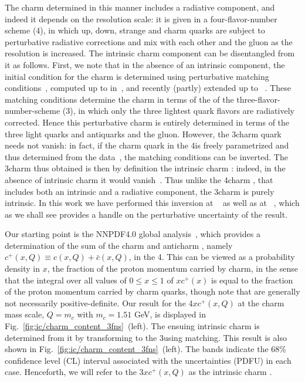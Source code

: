 The charm \pdf determined in this manner includes a  radiative component, and
indeed it depends on the resolution scale: it is  given in a four-flavor-number
scheme (4\fns), in which up,  down, strange and charm quarks are subject to 
perturbative radiative corrections and mix with each other and the gluon as the
resolution is increased.
%
The intrinsic charm component can be disentangled from it as follows.
%
First, we note that in the absence of an intrinsic component, the initial
condition for the charm \pdf is determined using perturbative matching
conditions~\cite{Collins:1986mp}, computed  up to \nnlo in~\cite{pdfnnlo},
and recently (partly) extended up to \nnnlo~\cite{Bierenbaum:2009zt,Bierenbaum:2009mv,Ablinger:2010ty,Ablinger:2014vwa,Ablinger:2014uka,Behring:2014eya,Ablinger_2014,Ablinger:2014nga,Blumlein:2017wxd}.
%
These matching conditions  determine the charm \pdf in terms of the \pdfs of the
three-flavor-number-scheme (3\fns), in which only the three lightest quark 
flavors are radiatively corrected.
%
Hence this perturbative charm \pdf is entirely determined in terms of the three
light quarks and antiquarks and the gluon.
%
However, the 3\fns charm quark \pdf needs not
vanish: in fact, if the charm quark \pdf in the 4\fns is freely
parametrized and thus determined from the data~\cite{Ball:2015tna},
the matching conditions can be inverted.
%
The 3\fns charm \pdf
thus obtained is then by definition the intrinsic charm \pdf: indeed, in
the absence of intrinsic charm it would vanish~\cite{Ball:2015dpa}. 
Thus unlike the 4\fns charm \pdf, that
includes both an intrinsic and a radiative
component, the 3\fns charm
\pdf is purely intrinsic.
%
In this work we have performed this inversion at
\nnlo~\cite{pdfnnlo} as well as at \nnnlo~\cite{Bierenbaum:2009zt,Bierenbaum:2009mv,Ablinger:2010ty,Ablinger:2014vwa,Ablinger:2014uka,Behring:2014eya,Ablinger_2014,Ablinger:2014nga,Blumlein:2017wxd},
which as we shall see provides a handle on the perturbative uncertainty of the \nnlo result.

Our starting point is the NNPDF4.0 global
analysis~\cite{Ball:2021leu}, which provides a determination of
the sum of the charm and
anticharm \pdfs, namely  $c^+(x,Q)\equiv c(x,Q)+\bar  c(x,Q)$, in the
4\fns. 
This can be viewed 
as a probability density in $x$, the fraction of the proton momentum
carried by charm, in the sense that the integral over all 
values of $0\le x\le1$ of 
$xc^+(x)$ is equal to  the fraction of
the proton momentum carried by charm quarks, though note that \pdfs are
generally not necessarily positive-definite. 
%
Our result for  the 4\fns $xc^+(x,Q)$  at
the charm mass scale, $Q=m_c$ with $m_c=1.51$ GeV, 
is displayed in Fig.~\ref{fig:ic/charm_content_3fns}~(left).
%
%
The ensuing intrinsic charm is determined from it
by transforming to the 3\fns using
\nnlo matching.
%
This result is also shown 
in Fig.~\ref{fig:ic/charm_content_3fns}~(left).
The bands  indicate the 68\% confidence level (CL) interval
associated with the \pdf uncertainties  (PDFU) in each case.  Henceforth, we will refer to
the  3\fns $xc^+(x,Q)$ \pdf as the
intrinsic charm \pdf. 

